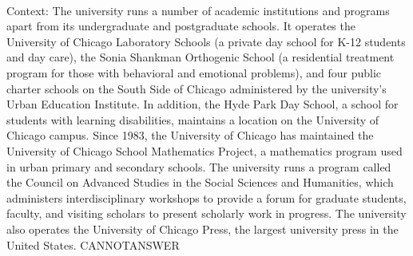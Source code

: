 \documentclass[11pt,a4paper, onecolumn]{article}
\begin{document}
\\ Context: The university runs a number of academic institutions and programs apart from its undergraduate and postgraduate schools. It operates the University of Chicago Laboratory Schools (a private day school for K-12 students and day care), the Sonia Shankman Orthogenic School (a residential treatment program for those with behavioral and emotional problems), and four public charter schools on the South Side of Chicago administered by the university's Urban Education Institute. In addition, the Hyde Park Day School, a school for students with learning disabilities, maintains a location on the University of Chicago campus. Since 1983, the University of Chicago has maintained the University of Chicago School Mathematics Project, a mathematics program used in urban primary and secondary schools. The university runs a program called the Council on Advanced Studies in the Social Sciences and Humanities, which administers interdisciplinary workshops to provide a forum for graduate students, faculty, and visiting scholars to present scholarly work in progress. The university also operates the University of Chicago Press, the largest university press in the United States. CANNOTANSWER
\end{document}
